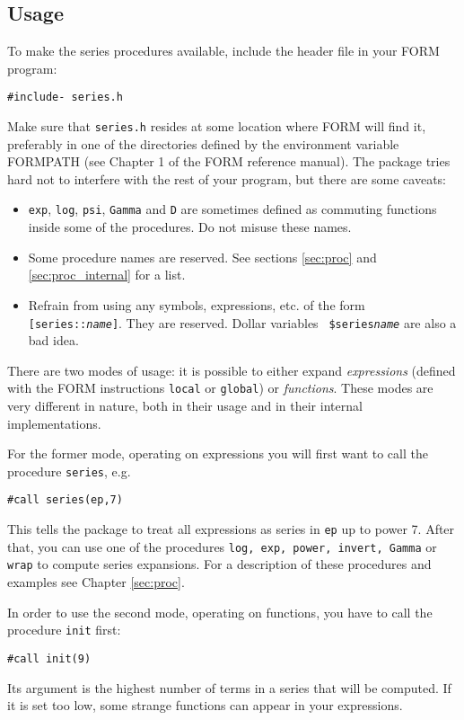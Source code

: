 \documentclass{article}
\begin{document}
\subsection{Usage}
\label{sec:usage}

To make the series procedures available, include the header file in your
FORM program:
\begin{verbatim}
#include- series.h
\end{verbatim}
Make sure that {\tt series.h} resides at some location where FORM will find
it, preferably in one of the directories defined by the environment
variable \mbox{FORMPATH} (see Chapter 1 of the FORM reference manual). The
package tries hard not to interfere with the rest of your program, but
there are some caveats:
\begin{itemize}
\item {\tt exp}, {\tt log}, {\tt psi}, {\tt Gamma} and {\tt D} are
  sometimes defined as commuting functions inside some of the
  procedures. Do not misuse these names.
\item Some procedure names are reserved. See sections \ref{sec:proc} and
  \ref{sec:proc_internal} for a list.
\item Refrain from  using any symbols, expressions, etc. of the form
  {\tt[series::{\it name}]}. They are reserved. Dollar variables {\tt
    \$series{\it name}} are also a bad idea.
\end{itemize}

There are two modes of usage: it is possible to either expand {\em expressions}
(defined with the FORM instructions {\tt local} or {\tt global}) or {\em
  functions}. These modes are very different in nature, both in their
usage and in their internal implementations.

For the former mode, operating on expressions you will first want to
call the procedure {\tt series}, e.g.
\begin{verbatim}
#call series(ep,7)
\end{verbatim}
This tells the package to treat all expressions as series in {\tt ep} up
to power 7. After that, you can use one of the procedures {\tt log, exp,
  power, invert, Gamma} or {\tt wrap} to compute series expansions. For a
description of these procedures and examples see Chapter \ref{sec:proc}.

\medskip

In order to use the second mode, operating on functions, you have to
call the procedure {\tt init} first:
\begin{verbatim}
#call init(9)
\end{verbatim}
Its argument is the highest number of terms in a series that will be
computed. If it is set too low, some strange functions can appear in
your expressions.
\end{document}
